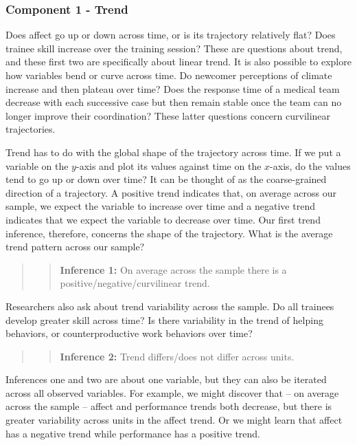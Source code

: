 \documentclass[english,,man]{apa6}
\theoremstyle{definition}
\theoremstyle{definition}
\theoremstyle{definition}
\theoremstyle{remark}
\begin{document}
\hypertarget{component-1---trend}{%
\subsubsection{Component 1 - Trend}\label{component-1---trend}}

Does affect go up or down across time, or is its trajectory relatively
flat? Does trainee skill increase over the training session? These are
questions about trend, and these first two are specifically about linear
trend. It is also possible to explore how variables bend or curve across
time. Do newcomer perceptions of climate increase and then plateau over
time? Does the response time of a medical team decrease with each
successive case but then remain stable once the team can no longer
improve their coordination? These latter questions concern curvilinear
trajectories.

Trend has to do with the global shape of the trajectory across time. If
we put a variable on the \(y\)-axis and plot its values against time on
the \(x\)-axis, do the values tend to go up or down over time? It can be
thought of as the coarse-grained direction of a trajectory. A positive
trend indicates that, on average across our sample, we expect the
variable to increase over time and a negative trend indicates that we
expect the variable to decrease over time. Our first trend inference,
therefore, concerns the shape of the trajectory. What is the average
trend pattern across our sample?

\begin{quote}
\begin{quote}
\textbf{Inference 1:} On average across the sample there is a
positive/negative/curvilinear trend.
\end{quote}
\end{quote}

Researchers also ask about trend variability across the sample. Do all
trainees develop greater skill across time? Is there variability in the
trend of helping behaviors, or counterproductive work behaviors over
time?

\begin{quote}
\begin{quote}
\textbf{Inference 2:} Trend differs/does not differ across units.
\end{quote}
\end{quote}

Inferences one and two are about one variable, but they can also be
iterated across all observed variables. For example, we might discover
that -- on average across the sample -- affect and performance trends
both decrease, but there is greater variability across units in the
affect trend. Or we might learn that affect has a negative trend while
performance has a positive trend.
\end{document}
